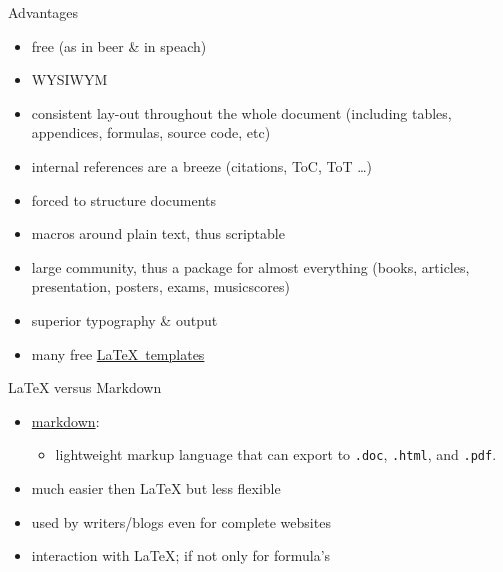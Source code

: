 \documentclass[ignorenonframetext]{beamer}
\begin{document}
\begin{frame}{Advantages}

\begin{itemize}
  \item free (as in beer \& in speach)\pause
  \item WYSIWYM \pause
  \item consistent lay-out throughout the whole document (including tables,
    appendices, formulas, source code, etc) \pause
  \item internal references are a breeze (citations, ToC, ToT \ldots{})\pause
  \item forced to structure documents\pause
  \item macros around plain text, thus scriptable\pause
  \item large community, thus a package for almost everything (books, articles,
    presentation, posters, exams, musicscores)\pause
  \item superior typography \& output \pause
  \item many free
    \href{https://www.overleaf.com/latex/templates/}{\LaTeX~templates}
\end{itemize}

\end{frame}

\begin{frame}{\LaTeX{} versus Markdown}
	\begin{itemize}
		\item
    \href{https://www.overleaf.com/learn/latex/Articles/How_to_write_in_Markdown_on_Overleaf}{markdown}:
    \begin{itemize}
      \item
    lightweight markup language that can export
      to \texttt{.doc}, \texttt{.html}, and \texttt{.pdf}. \newline
    \end{itemize}
		\item much easier then \LaTeX{} but less flexible \newline
		\item used by writers/blogs even for complete websites \newline
		\item interaction with \LaTeX{}; if not only for formula's
	\end{itemize}
\end{frame}
\end{document}
